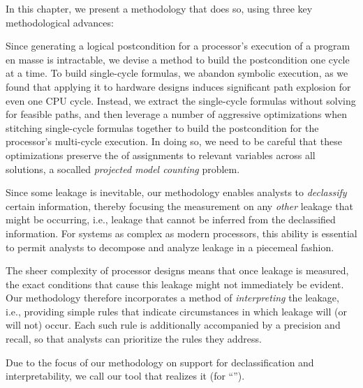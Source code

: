 In this chapter, we present a methodology that does so, using three key
methodological advances:
\begin{compactitem}
\item Since generating a logical postcondition for a processor's
  execution of a program en masse is intractable, we devise a method
  to build the postcondition one cycle at a time.  To build
  single-cycle formulas, we abandon symbolic execution, as we found
  that applying it to hardware designs induces significant path
  explosion for even one CPU cycle.  Instead, we extract the
  single-cycle formulas without solving for feasible paths, and then
  leverage a number of aggressive optimizations when stitching
  single-cycle formulas together to build the postcondition for the
  processor's multi-cycle execution.  In doing so, we need to be
  careful that these optimizations preserve the  of
  assignments to relevant variables across all solutions, a socalled
  \textit{projected model counting} problem. 

\item Since some leakage is inevitable, our methodology enables
  analysts to \textit{declassify} certain information, thereby
  focusing the measurement on any \textit{other} leakage that might be
  occurring, i.e., leakage that cannot be inferred from the
  declassified information.  For systems as complex as modern
  processors, this ability is essential to permit analysts to
  decompose and analyze leakage in a piecemeal fashion.

\item The sheer complexity of processor designs means that once
  leakage is measured, the exact conditions that cause this leakage
  might not immediately be evident.  Our methodology therefore
  incorporates a method of \textit{interpreting} the leakage, i.e.,
  providing simple rules that indicate circumstances in which leakage
  will (or will not) occur.  Each such rule is additionally
  accompanied by a precision and recall, so that analysts can
  prioritize the rules they address.
\end{compactitem}
Due to the focus of our methodology on support for declassification
and interpretability, we call our tool that realizes it \thirdsysname (for
``\thirdsysnameLong'').

